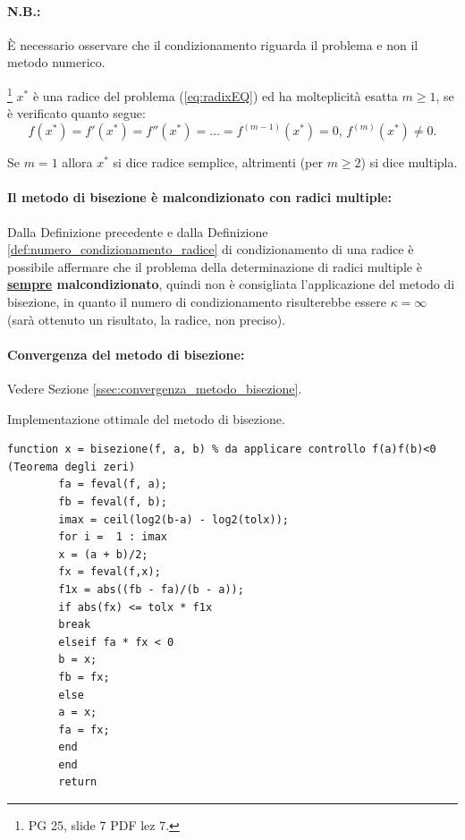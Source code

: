 \paragraph{N.B.:} È necessario osservare che il condizionamento riguarda il problema e non il metodo numerico.

\begin{definition}\label{def:radice_molteplicita_m}
	\footnote{PG 25, slide 7 PDF lez 7.} $x^*$ è una radice del problema (\ref{eq:radixEQ}) ed ha molteplicità esatta $m\geq 1$, se è verificato quanto segue:
	\begin{equation*}
		f(x^*)=f'(x^*)=f''(x^*)=\hdots=f^{(m-1)}(x^*)=0,\, f^{(m)}(x^*)\neq 0.
	\end{equation*}
\end{definition}
Se $m=1$ allora $x^*$ si dice radice semplice, altrimenti (per $m\geq 2$) si dice multipla.

\paragraph{Il metodo di bisezione è malcondizionato con radici multiple:} Dalla Definizione precedente e dalla Definizione \ref{def:numero_condizionamento_radice} di condizionamento di una radice è possibile affermare che il problema della determinazione di radici multiple è \textbf{\underline{sempre} malcondizionato}, quindi non è consigliata l'applicazione del metodo di bisezione, in quanto il numero di condizionamento risulterebbe essere $\kappa=\infty$ (sarà ottenuto un risultato, la radice, non preciso).

\paragraph{Convergenza del metodo di bisezione:} Vedere Sezione \ref{ssec:convergenza_metodo_bisezione}.

\begin{algorithm}\caption{Implementazione ottimale del metodo di bisezione.}
	\label{alg:metodo_bisezione}
	\begin{lstlisting}[style=Matlab-editor]
		function x = bisezione(f, a, b) % da applicare controllo f(a)f(b)<0 (Teorema degli zeri)
		fa = feval(f, a);
		fb = feval(f, b);
		imax = ceil(log2(b-a) - log2(tolx));
		for i =  1 : imax
		x = (a + b)/2;
		fx = feval(f,x);
		f1x = abs((fb - fa)/(b - a));
		if abs(fx) <= tolx * f1x
		break
		elseif fa * fx < 0
		b = x;
		fb = fx;
		else
		a = x;
		fa = fx;
		end
		end
		return
	\end{lstlisting}
\end{algorithm}

